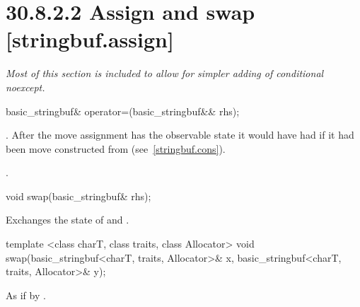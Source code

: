 \documentclass[ebook,11pt,article]{memoir}
\begin{document}
\section{30.8.2.2 Assign and swap [stringbuf.assign]}
\textit{Most of this section is included to allow for simpler adding of conditional noexcept.}

%
\begin{itemdecl}
basic_stringbuf& operator=(basic_stringbuf&& rhs);
\end{itemdecl}

\begin{itemdescr}
\pnum
\effects {}. After the move assignment  has the observable state it would
have had if it had been move constructed from  (see~\ref{stringbuf.cons}).

\pnum
\returns {}.
\end{itemdescr}

%
\begin{itemdecl}
void swap(basic_stringbuf& rhs);
\end{itemdecl}

\begin{itemdescr}
\pnum
\effects Exchanges the state of 
and .
\end{itemdescr}

%
\begin{itemdecl}
template <class charT, class traits, class Allocator>
  void swap(basic_stringbuf<charT, traits, Allocator>& x,
            basic_stringbuf<charT, traits, Allocator>& y);
\end{itemdecl}

\begin{itemdescr}
\pnum
\effects As if by .
\end{itemdescr}
\end{document}
